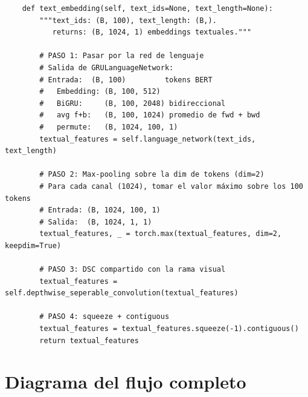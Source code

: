 \begin{verbatim}
    def text_embedding(self, text_ids=None, text_length=None):
        """text_ids: (B, 100), text_length: (B,).
           returns: (B, 1024, 1) embeddings textuales."""

        # PASO 1: Pasar por la red de lenguaje
        # Salida de GRULanguageNetwork:
        # Entrada:  (B, 100)         tokens BERT
        #   Embedding: (B, 100, 512)
        #   BiGRU:     (B, 100, 2048) bidireccional
        #   avg f+b:   (B, 100, 1024) promedio de fwd + bwd
        #   permute:   (B, 1024, 100, 1)
        textual_features = self.language_network(text_ids, text_length)

        # PASO 2: Max-pooling sobre la dim de tokens (dim=2)
        # Para cada canal (1024), tomar el valor máximo sobre los 100 tokens
        # Entrada: (B, 1024, 100, 1)
        # Salida:  (B, 1024, 1, 1)
        textual_features, _ = torch.max(textual_features, dim=2, keepdim=True)

        # PASO 3: DSC compartido con la rama visual
        textual_features = self.depthwise_seperable_convolution(textual_features)

        # PASO 4: squeeze + contiguous
        textual_features = textual_features.squeeze(-1).contiguous()
        return textual_features
\end{verbatim}

\section{Diagrama del flujo completo}

